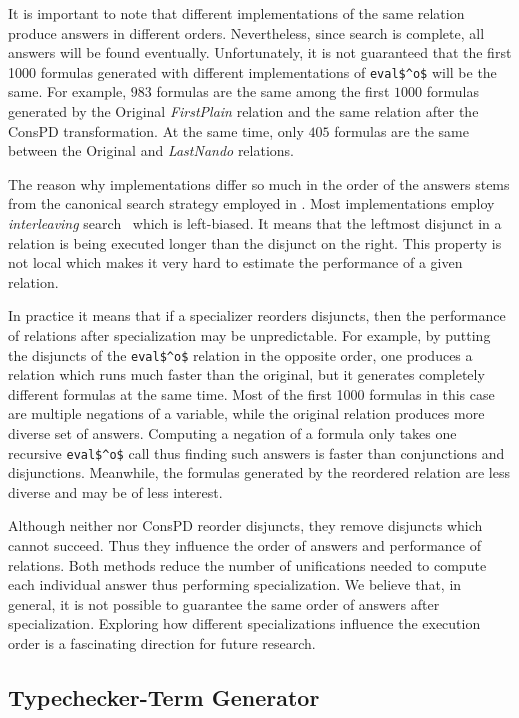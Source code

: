 It is important to note that different implementations of the same \mk relation produce answers in different orders.
Nevertheless, since \mk search is complete, all answers will be found eventually.
Unfortunately, it is not guaranteed that the first 1000 formulas generated with different implementations of \lstinline{eval$^o$} will be the same.
For example, $983$ formulas are the same among the first $1000$ formulas generated by the Original \emph{FirstPlain} relation and the same relation after the ConsPD transformation.
At the same time, only $405$ formulas are the same between the Original and \ecce \emph{LastNando} relations.

The reason why implementations differ so much in the order of the answers stems from the canonical search strategy employed in \mk.
Most \mk implementations employ \emph{interleaving} search~\cite{10.1145/1090189.1086390} which is left-biased.
It means that the leftmost disjunct in a relation is being executed longer than the disjunct on the right.
This property is not local which makes it very hard to estimate the performance of a given relation.

In practice it means that if a specializer reorders disjuncts, then the performance of relations after specialization may be unpredictable.
For example, by putting the disjuncts of the \lstinline{eval$^o$} relation in the opposite order, one produces a relation which runs much faster than the original, but it generates completely different formulas at the same time.
Most of the first 1000 formulas in this case are multiple negations of a variable, while the original relation produces more diverse set of answers.
Computing a negation of a formula only takes one recursive \lstinline{eval$^o$} call thus finding such answers is faster than conjunctions and disjunctions.
Meanwhile, the formulas generated by the reordered relation are less diverse and may be of less interest.

Although neither \ecce nor ConsPD reorder disjuncts, they remove disjuncts which cannot succeed.
Thus they influence the order of answers and performance of relations.
Both methods reduce the number of unifications needed to compute each individual answer thus performing specialization.
We believe that, in general, it is not possible to guarantee the same order of answers after specialization.
Exploring how different specializations influence the execution order is a fascinating direction for future research.


\subsection{Typechecker-Term Generator}

